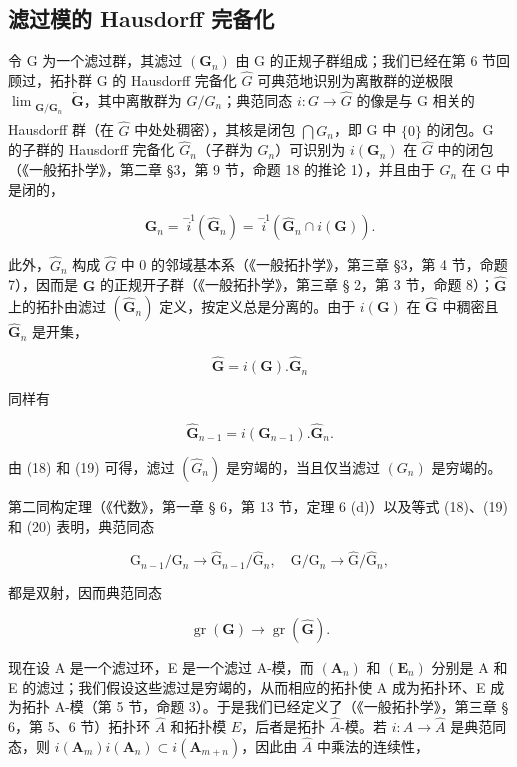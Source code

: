 \subsection{滤过模的 Hausdorff 完备化}

令 G 为一个滤过群，其滤过 \((\mathbf{G}_{n})\) 由 G 的正规子群组成；我们已经在第 6 节回顾过，拓扑群 G 的 Hausdorff 完备化 \(\hat{G}\) 可典范地识别为离散群的逆极限 \(\lim_{\substack{\mathbf{G}/\mathbf{G}_{n}\\ }} \overleftarrow{\mathbf{G}}\)，其中离散群为 \(G/G_{n}\)；典范同态 \(i: G \to \hat{G}\) 的像是与 G 相关的 Hausdorff 群（在 \(\hat{G}\) 中处处稠密），其核是闭包 \(\bigcap G_{n}\)，即 G 中 \(\{0\}\) 的闭包。G 的子群的 Hausdorff 完备化 \(\hat{G}_{n}\)（子群为 \(G_{n}\)）可识别为 \(i(\mathbf{G}_{n})\) 在 \(\hat{G}\) 中的闭包（《一般拓扑学》，第二章 §3，第 9 节，命题 18 的推论 1），并且由于 \(G_{n}\) 在 G 中是闭的，


\[
\mathbf {G} _ {n} = \stackrel {- 1} {i} (\hat {\mathbf {G}} _ {n}) = \stackrel {- 1} {i} (\hat {\mathbf {G}} _ {n} \cap i (\mathbf {G})).\tag{18}
\]

此外，\(\hat{G}_n\) 构成 \(\hat{G}\) 中 0 的邻域基本系（《一般拓扑学》，第三章 §3，第 4 节，命题 7），因而是 \(\hat{\mathbf{G}}\) 的正规开子群（《一般拓扑学》，第三章 § 2，第 3 节，命题 8）；\(\hat{\mathbf{G}}\) 上的拓扑由滤过 \((\hat{\mathbf{G}}_n)\) 定义，按定义总是分离的。由于 \(i(\mathbf{G})\) 在 \(\hat{\mathbf{G}}\) 中稠密且 \(\hat{\mathbf{G}}_n\) 是开集，

\[
\hat {\mathbf {G}} = i (\mathbf {G}). \hat {\mathbf {G}} _ {n}\tag{19}
\]

同样有

\[
\hat {\mathbf {G}} _ {n - 1} = i \left(\mathbf {G} _ {n - 1}\right). \hat {\mathbf {G}} _ {n}.\tag{20}
\]

由 (18) 和 (19) 可得，滤过 \((\hat{G}_n)\) 是穷竭的，当且仅当滤过 \((G_n)\) 是穷竭的。

第二同构定理（《代数》，第一章 § 6，第 13 节，定理 6 (d)）以及等式 (18)、(19) 和 (20) 表明，典范同态

\[
\mathrm{G} _ {n - 1} / \mathrm{G} _ {n} \rightarrow \hat {\mathrm{G}} _ {n - 1} / \hat {\mathrm{G}} _ {n}, \quad \mathrm{G} / \mathrm{G} _ {n} \rightarrow \hat {\mathrm{G}} / \hat {\mathrm{G}} _ {n},\tag{21}
\]

都是双射，因而典范同态

\[
\operatorname{gr} (\mathbf {G}) \rightarrow \operatorname{gr} (\hat {\mathbf {G}}).\tag{22}
\]

现在设 A 是一个滤过环，E 是一个滤过 A-模，而 \((\mathbf{A}_{n})\) 和 \((\mathbf{E}_{n})\) 分别是 A 和 E 的滤过；我们假设这些滤过是穷竭的，从而相应的拓扑使 A 成为拓扑环、E 成为拓扑 A-模（第 5 节，命题 3）。于是我们已经定义了（《一般拓扑学》，第三章 § 6，第 5、6 节）拓扑环 \(\hat{A}\) 和拓扑模 \(\hat{E}\)，后者是拓扑 \(\hat{A}\)-模。若 \(i: A \to \hat{A}\) 是典范同态，则 \(i(\mathbf{A}_{m})i(\mathbf{A}_{n}) \subset i(\mathbf{A}_{m+n})\)，因此由 \(\hat{A}\) 中乘法的连续性，

